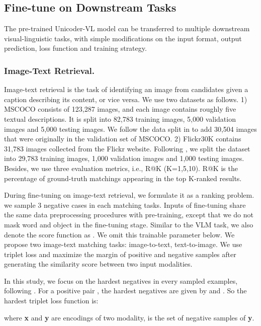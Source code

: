\documentclass[letterpaper]{article} \usepackage{aaai20}  \usepackage{times}  \usepackage{helvet} \usepackage{courier}  \usepackage[hyphens]{url}  \usepackage{graphicx} \urlstyle{rm} \def\UrlFont{\rm}  \usepackage{graphicx}  \frenchspacing  \setlength{\pdfpagewidth}{8.5in}  \setlength{\pdfpageheight}{11in}  \usepackage{amssymb}
\begin{document}
\subsection{Fine-tune on Downstream Tasks}
The pre-trained Unicoder-VL model can be transferred to multiple downstream visual-linguistic tasks,
with simple modifications on the input format, output prediction, loss function and training strategy.
\subsubsection{Image-Text Retrieval.}
Image-text retrieval is the task of identifying an image from candidates given a caption describing its content, or vice versa. We use two datasets as follows. 1) MSCOCO consists of 123,287 images, and each image contains roughly five textual descriptions. It is split into 82,783 training images, 5,000 validation images and 5,000 testing images. We follow the data split in \cite{faghri2017vse++} to add 30,504 images that were originally in the validation set of MSCOCO. 2) Flickr30K contains 31,783 images collected from the Flickr website. Following \cite{karpathy2015deep}, we split the dataset into 29,783 training images, 1,000 validation images and 1,000 testing images. Besides, we use three evaluation metrics, i.e., R@K (K=1,5,10). R@K is the percentage of ground-truth matchings appearing in the top K-ranked results. 

During fine-tuning on image-text retrieval, we formulate it as a ranking problem. we sample 3 negative cases in each matching tasks. 
Inputs of fine-tuning share the same data preprocessing procedures with pre-training, except that we do not mask word and object in the fine-tuning stage. Similar to the VLM task, we also denote the score function as . We omit this trainable parameter  below. We propose two image-text matching tasks: image-to-text, text-to-image. We use triplet loss and maximize the margin of positive and negative samples after generating the similarity score between two input modalities. 

In this study, we focus on the hardest negatives in every sampled examples, following \cite{faghri2017vse++}. For a positive pair , the hardest negatives are given by  and . So the hardest triplet loss function is:
   
where \textbf{x} and \textbf{y} are encodings of two modality,  is the set of negative samples of \textbf{y}. 
\end{document}
